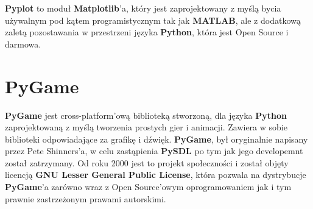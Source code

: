 \textbf{Pyplot} to moduł \textbf{Matplotlib}'a, który jest zaprojektowany z myślą bycia używalnym pod kątem programistycznym tak jak \textbf{MATLAB}, ale z dodatkową zaletą pozostawania w przestrzeni języka \textbf{Python}, która jest Open Source i darmowa.


\section{PyGame}

\textbf{PyGame} \cite{PyGameDocumentation} \cite{WikipediaPyGame} jest cross-platform'ową biblioteką stworzoną, dla języka \textbf{Python} zaprojektowaną z myślą tworzenia prostych gier i animacji. Zawiera w sobie biblioteki odpowiadające za grafikę i dźwięk.
\textbf{PyGame}, był oryginalnie napisany przez Pete Shinners'a, w celu zastąpienia \textbf{PySDL} po tym jak jego developemnt został zatrzymany. Od roku 2000 jest to projekt społeczności i został objęty licencją \textbf{GNU Lesser General Public License}, która pozwala na dystrybucje \textbf{PyGame}'a zarówno wraz z Open Source'owym oprogramowaniem jak i tym prawnie zastrzeżonym prawami autorskimi.




